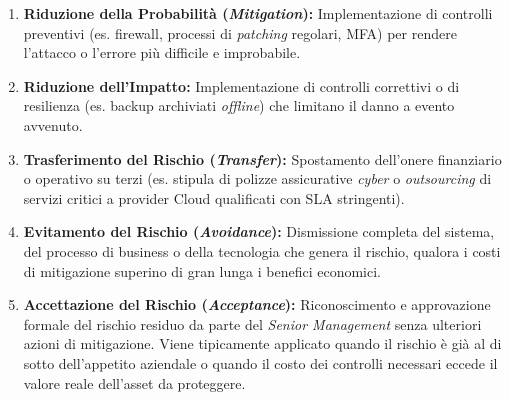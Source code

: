 \begin{exbox}
\begin{enumerate}
    \item \textbf{Riduzione della Probabilità (\textit{Mitigation}):} Implementazione di controlli preventivi (es. firewall, processi di \textit{patching} regolari, MFA) per rendere l'attacco o l'errore più difficile e improbabile.
    \item \textbf{Riduzione dell'Impatto:} Implementazione di controlli correttivi o di resilienza (es. backup archiviati \textit{offline}) che limitano il danno a evento avvenuto.
    \item \textbf{Trasferimento del Rischio (\textit{Transfer}):} Spostamento dell'onere finanziario o operativo su terzi (es. stipula di polizze assicurative \textit{cyber} o \textit{outsourcing} di servizi critici a provider Cloud qualificati con SLA stringenti).
    \item \textbf{Evitamento del Rischio (\textit{Avoidance}):} Dismissione completa del sistema, del processo di business o della tecnologia che genera il rischio, qualora i costi di mitigazione superino di gran lunga i benefici economici.
    \item \textbf{Accettazione del Rischio (\textit{Acceptance}):} Riconoscimento e approvazione formale del rischio residuo da parte del \textit{Senior Management} senza ulteriori azioni di mitigazione. Viene tipicamente applicato quando il rischio è già al di sotto dell'appetito aziendale o quando il costo dei controlli necessari eccede il valore reale dell'asset da proteggere.
\end{enumerate}
\end{exbox}
